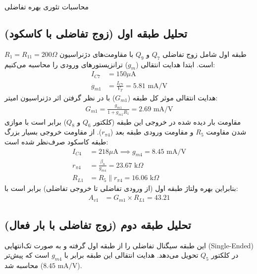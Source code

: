 \documentclass[12pt,a4paper]{article}
\begin{document}
\begin{calcbox}{محاسبات تئوری بهره تفاضلی}
\subsection*{تحلیل طبقه اول (زوج تفاضلی با کاسکود)}
طبقه اول شامل زوج تفاضلی $Q_7$ و $Q_9$ با مقاومت‌های دژنراسیون $R_1 = R_{11} = 200 \Omega$ است. ابتدا هدایت انتقالی ($g_m$) ترانزیستورهای ورودی را محاسبه می‌کنیم:
\begin{align*}
	I_{C7} &= 150 \mu\text{A} \\
	g_{m1} &= \frac{I_{C7}}{V_T} = 5.81 \text{ mA/V}
\end{align*}
هدایت انتقالی موثر کل طبقه ($G_{m1}$) با در نظر گرفتن اثر دژنراسیون امیتر:
\begin{align*}
	G_{m1} = \frac{g_{m1}}{1 + g_{m1}R_1} = 2.69 \text{ mA/V}
\end{align*}
مقاومت بار دیده شده در خروجی این طبقه (کلکتور $Q_6$ و $Q_8$) برابر است با موازی شدن مقاومت $R_5$ و مقاومت ورودی طبقه بعد ($r_{\pi 4}$). از مقاومت خروجی بسیار بزرگ طبقه کاسکود صرف‌نظر شده است:
\begin{align*}
	I_{C4} &= 218 \mu\text{A} \implies g_{m4} = 8.45 \text{ mA/V} \\
	r_{\pi 4} &= \frac{\beta_n}{g_{m4}} = 23.67 \text{ k}\Omega \\
	R_{L1} &= R_5 \parallel r_{\pi 4} =  16.06 \text{ k}\Omega
\end{align*}
بنابراین بهره ولتاژ طبقه اول (از ورودی تفاضلی تا خروجی تفاضلی) برابر است با:
\begin{align*}
	A_{v1} &= G_{m1} \times R_{L1} =  43.21
\end{align*}

\subsection*{تحلیل طبقه دوم (زوج تفاضلی با بار فعال)}
این طبقه سیگنال تفاضلی را از طبقه اول گرفته و به صورت تک‌انتهایی (Single-Ended) در کلکتور $Q_5$ تحویل می‌دهد. هدایت انتقالی این طبقه برابر با $g_{m4}$ است که پیش‌تر محاسبه شد ($8.45 \text{ mA/V}$). 


\end{calcbox}
\end{document}
